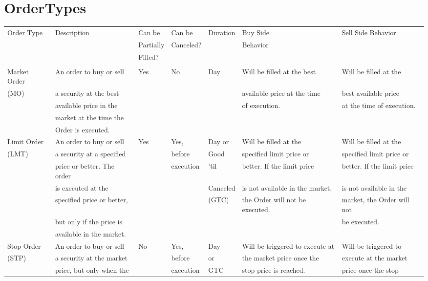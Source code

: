 \documentclass[11pt]{article}
\begin{document}
\section{OrderTypes}
\label{sec:org58f7fcc}
\begin{center}
\begin{tabular}{lllllll}
\hline
Order Type & Description & Can be & Can be & Duration & Buy Side & Sell Side Behavior\\[0pt]
 &  & Partially & Canceled? &  & Behavior & \\[0pt]
 &  & Filled? &  &  &  & \\[0pt]
 &  &  &  &  &  & \\[0pt]
\hline
Market Order & An order to buy or sell & Yes & No & Day & Will be filled at the best & Will be filled at the\\[0pt]
(MO) & a security at the best &  &  &  & available price at the time & best available price\\[0pt]
 & available price in the &  &  &  & of execution. & at the time of execution.\\[0pt]
 & market at the time the &  &  &  &  & \\[0pt]
 & Order is executed. &  &  &  &  & \\[0pt]
\hline
Limit Order & An order to buy or sell & Yes & Yes, & Day or & Will be filled at the & Will be filled at the\\[0pt]
(LMT) & a security at a specified &  & before & Good & specified limit price or & specified limit price or\\[0pt]
 & price or better. The order &  & execution & 'til & better. If the limit price & better. If the limit price\\[0pt]
 & is executed at the &  &  & Canceled & is not available in the market, & is not available in the\\[0pt]
 & specified price or better, &  &  & (GTC) & the Order will not be executed. & market, the Order will not\\[0pt]
 & but only if the price is &  &  &  &  & be executed.\\[0pt]
 & available in the market. &  &  &  &  & \\[0pt]
\hline
Stop Order & An order to buy or sell & No & Yes, & Day & Will be triggered to execute at & Will be triggered to\\[0pt]
(STP) & a security at the market &  & before & or & the market price once the & execute at the market\\[0pt]
 & price, but only when the &  & execution & GTC & stop price is reached. & price once the stop\\[0pt]

\end{tabular}
\end{center}
\end{document}
